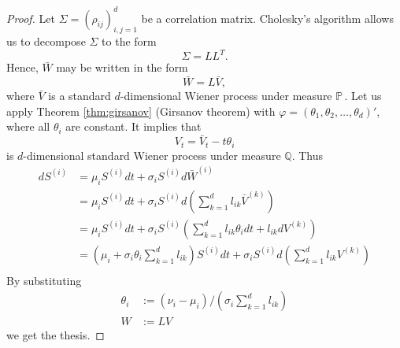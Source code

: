 \documentclass[a4paper,12pt, oneside]{book}
\theoremstyle{definition}
\theoremstyle{remark}
\def\P{{\mathbb{P}}\,}
\begin{document}
\begin{proof}
 Let $\Sigma = (\rho_{ij})_{i,j=1}^d$ be a correlation matrix. Cholesky's algorithm allows us to decompose $\Sigma$ to the form
 \[ \Sigma = LL^T. \]
 Hence, $\bar{W}$ may be written in the form
 \[ \bar{W} = L \bar{V}, \]
 where $\bar{V}$ is a standard $d$-dimensional Wiener process under measure $\P$. Let us apply Theorem \ref{thm:girsanov} (Girsanov theorem) with $\varphi = (\theta_1, \theta_2, \ldots, \theta_d)'$, where all $\theta_i$ are constant. It implies that
 \[ V_t = \bar{V}_t - t\theta_i \]
 is $d$-dimensional standard Wiener process under measure $\mathbb{Q}$. Thus
 \begin{equation*}
  \begin{split}
   dS^{(i)} &= \mu_i S^{(i)} dt + \sigma_i S^{(i)} d\bar{W}^{(i)} \\
            &= \mu_i S^{(i)} dt + \sigma_i S^{(i)} d\left(\sum\limits_{k=1}^d l_{ik} \bar{V}^{(k)}\right) \\
            &= \mu_i S^{(i)} dt + \sigma_i S^{(i)} \left(\sum\limits_{k=1}^d l_{ik}\theta_i dt + l_{ik}d V^{(k)}\right) \\    
            &= \left(\mu_i + \sigma_i \theta_i \sum\limits_{k=1}^d l_{ik} \right) S^{(i)} dt + \sigma_i S^{(i)} d\left(\sum\limits_{k=1}^d l_{ik} V^{(k)}\right) \\    
  \end{split}
 \end{equation*}
 By substituting
 \begin{align*}
  \theta_i &:= (\nu_i - \mu_i)/(\sigma_i \sum\limits_{k=1}^d l_{ik})\\
  W &:= LV
 \end{align*}
 we get the thesis.
\end{proof}
\end{document}
